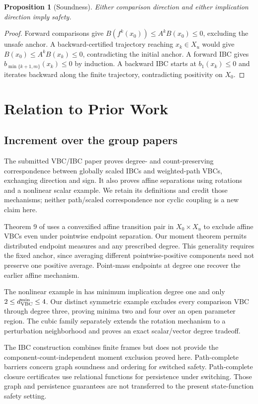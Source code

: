 \documentclass[journal,10pt]{IEEEtran}
\newtheorem{proposition}{Proposition}
\theoremstyle{definition}\newtheorem{definition}{Definition}
\theoremstyle{remark}
\begin{document}
\begin{proposition}[Soundness]
Either comparison direction and either implication direction imply safety.
\end{proposition}
\begin{proof}
Forward comparisons give $B(f^k(x_0))\leq A^kB(x_0)\leq0$, excluding the unsafe anchor. A backward-certified trajectory reaching $x_k\in X_u$ would give $B(x_0)\leq A^kB(x_k)\leq0$, contradicting the initial anchor. A forward IBC gives $b_{\min\{k+1,m\}}(x_k)\leq0$ by induction. A backward IBC starts at $b_1(x_k)\leq0$ and iterates backward along the finite trajectory, contradicting positivity on $X_0$.
\end{proof}

\section{Relation to Prior Work}\label{sec:literature}
\subsection{Increment over the group papers}
The submitted VBC/IBC paper \cite{submission} proves degree- and count-preserving correspondence between globally scaled IBCs and weighted-path VBCs, exchanging direction and sign. It also proves affine separations using rotations and a nonlinear scalar example. We retain its definitions and credit those mechanisms; neither path/scaled correspondence nor cyclic coupling is a new claim here.

Theorem 9 of \cite{submission} uses a convexified affine transition pair in $X_0\times X_u$ to exclude affine VBCs even under pointwise endpoint separation. Our moment theorem permits distributed endpoint measures and any prescribed degree. This generality requires the fixed anchor, since averaging different pointwise-positive components need not preserve one positive average. Point-mass endpoints at degree one recover the earlier affine mechanism.

The nonlinear example in \cite{submission} has minimum implication degree one and only $2\leq d_{\rm VBC}^{\min}\leq4$. Our distinct symmetric example excludes every comparison VBC through degree three, proving minima two and four over an open parameter region. The cubic family separately extends the rotation mechanism to a perturbation neighborhood and proves an exact scalar/vector degree tradeoff.

The IBC construction \cite{ibc} combines finite frames but does not provide the component-count-independent moment exclusion proved here. Path-complete barriers \cite{anand} concern graph soundness and ordering for switched safety. Path-complete closure certificates \cite{pccc} use relational functions for persistence under switching. Those graph and persistence guarantees are not transferred to the present state-function safety setting.
\end{document}
